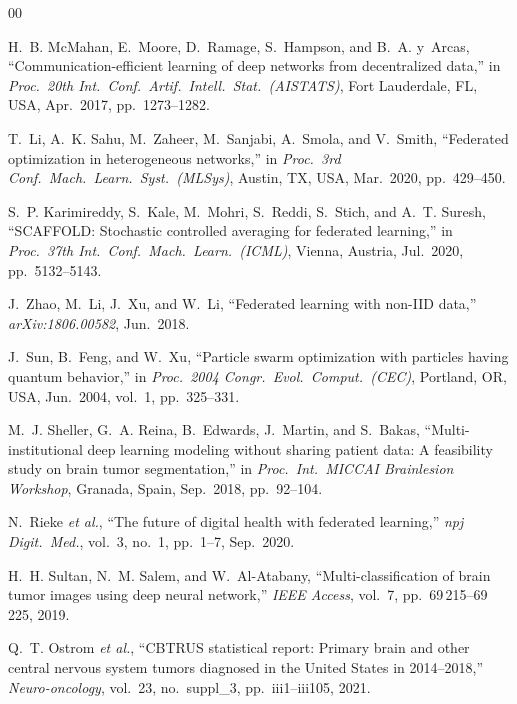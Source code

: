 \documentclass[conference]{IEEEtran}
\begin{document}
\begin{thebibliography}{00}

H.~B. McMahan, E.~Moore, D.~Ramage, S.~Hampson, and B.~A. y~Arcas,
``Communication-efficient learning of deep networks from decentralized data,''
in \textit{Proc.\ 20th Int.\ Conf.\ Artif.\ Intell.\ Stat.\ (AISTATS)},
Fort Lauderdale, FL, USA, Apr.\ 2017, pp.~1273--1282.

T.~Li, A.~K. Sahu, M.~Zaheer, M.~Sanjabi, A.~Smola, and V.~Smith,
``Federated optimization in heterogeneous networks,''
in \textit{Proc.\ 3rd Conf.\ Mach.\ Learn.\ Syst.\ (MLSys)}, Austin, TX, USA,
Mar.\ 2020, pp.~429--450.

S.~P. Karimireddy, S.~Kale, M.~Mohri, S.~Reddi, S.~Stich, and A.~T. Suresh,
``SCAFFOLD: Stochastic controlled averaging for federated learning,''
in \textit{Proc.\ 37th Int.\ Conf.\ Mach.\ Learn.\ (ICML)}, Vienna, Austria,
Jul.\ 2020, pp.~5132--5143.

J.~Zhao, M.~Li, J.~Xu, and W.~Li,
``Federated learning with non-IID data,''
\textit{arXiv:1806.00582}, Jun.\ 2018.

J.~Sun, B.~Feng, and W.~Xu,
``Particle swarm optimization with particles having quantum behavior,''
in \textit{Proc.\ 2004 Congr.\ Evol.\ Comput.\ (CEC)}, Portland, OR, USA,
Jun.\ 2004, vol.~1, pp.~325--331.

M.~J. Sheller, G.~A. Reina, B.~Edwards, J.~Martin, and S.~Bakas,
``Multi-institutional deep learning modeling without sharing patient data:
A feasibility study on brain tumor segmentation,''
in \textit{Proc.\ Int.\ MICCAI Brainlesion Workshop}, Granada, Spain,
Sep.\ 2018, pp.~92--104.

N.~Rieke \textit{et al.},
``The future of digital health with federated learning,''
\textit{npj Digit.\ Med.}, vol.~3, no.~1, pp.~1--7, Sep.\ 2020.

H.~H. Sultan, N.~M. Salem, and W.~Al-Atabany,
``Multi-classification of brain tumor images using deep neural network,''
\textit{IEEE Access}, vol.~7, pp.~69\,215--69\,225, 2019.

Q.~T. Ostrom \textit{et al.},
``CBTRUS statistical report: Primary brain and other central nervous system
tumors diagnosed in the United States in 2014--2018,''
\textit{Neuro-oncology}, vol.~23, no.~suppl\_3, pp.~iii1--iii105, 2021.


\end{thebibliography}
\end{document}
